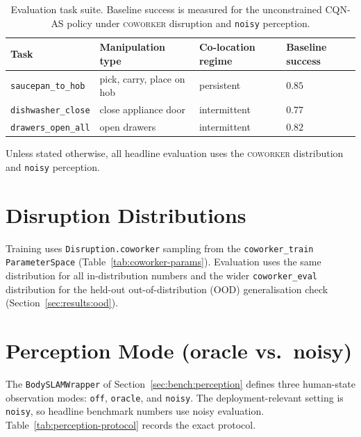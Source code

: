 \documentclass[11pt,a4paper]{report}
\newcommand{\cqnas}{CQN-AS}
\newcommand{\coworker}{\textsc{coworker}}
\begin{document}
\begin{table}[htbp]
\centering
\small
\caption{Evaluation task suite. Baseline success is measured for the
unconstrained \cqnas{} policy under \coworker{} disruption and
\texttt{noisy} perception.}
\label{tab:eval-tasks}
\begin{tabular}{llll}
\toprule
Task & Manipulation type & Co-location regime & Baseline success \\
\midrule
\texttt{saucepan\_to\_hob} & pick, carry, place on hob & persistent & $0.85$ \\
\texttt{dishwasher\_close} & close appliance door & intermittent & $0.77$ \\
\texttt{drawers\_open\_all} & open drawers & intermittent & $0.82$ \\
\bottomrule
\end{tabular}
\end{table}

Unless stated otherwise, all headline evaluation uses the
\coworker{} distribution and \texttt{noisy} perception.

\section{Disruption Distributions}
\label{sec:setup:disruptions}

Training uses \texttt{Disruption.coworker} sampling from the
\texttt{coworker\_train} \texttt{ParameterSpace}
(Table~\ref{tab:coworker-params}). Evaluation uses the same
distribution for all in-distribution numbers and the wider
\texttt{coworker\_eval} distribution for the held-out
out-of-distribution (OOD) generalisation check
(Section~\ref{sec:results:ood}).

\section{Perception Mode (oracle vs.\ noisy)}
\label{sec:setup:perception-mode}

The \texttt{BodySLAMWrapper} of Section~\ref{sec:bench:perception}
defines three human-state observation modes: \texttt{off},
\texttt{oracle}, and \texttt{noisy}. The deployment-relevant setting is
\texttt{noisy}, so headline benchmark numbers use noisy evaluation.
Table~\ref{tab:perception-protocol} records the exact protocol.
\end{document}
